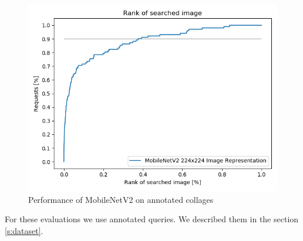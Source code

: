 \begin{figure}
    \centering
    \includegraphics[width=0.8\linewidth]{img/mobilenet_whole_image.png}
    \caption{Performance of MobileNetV2 on annotated collages}
    \label{fig:mobilenet_whole_image_example}
\end{figure}

For these evaluations we use annotated queries. We described them in the section \ref{s:dataset}.